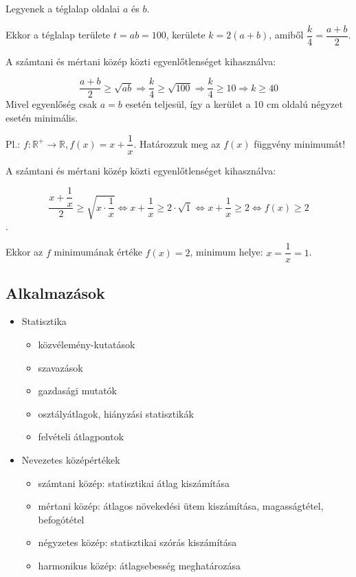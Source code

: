 \documentclass[12pt,a4paper]{article}
\begin{document}
Legyenek a téglalap oldalai $a$ és $b$.

Ekkor a téglalap területe $t = ab = 100$, kerülete $k = 2(a + b)$, amiből $\dfrac{k}{4}=\dfrac{a+b}{2}$.

A számtani és mértani közép közti egyenlőtlenséget kihasználva:

$$\dfrac{a+b}{2}\geq \sqrt{ab}\Rightarrow \dfrac{k}{4}\geq \sqrt{100}\Rightarrow \dfrac{k}{4}\geq 10\Rightarrow k\geq 40$$
Mivel egyenlőség csak $a = b$ esetén teljesül, így a kerület a 10 cm oldalú négyzet esetén minimális.

\vspace{20px}
Pl.: $f: \mathbb{R^+}\rightarrow \mathbb{R}, f(x)=x+\dfrac{1}{x}$. Határozzuk meg az $f(x)$ függvény minimumát!

A számtani és mértani közép közti egyenlőtlenséget kihasználva:

$$\dfrac{x+\dfrac{1}{x}}{2}\geq \sqrt{x\cdot \dfrac{1}{x}}\Leftrightarrow x+\dfrac{1}{x}\geq 2\cdot \sqrt{1}\Leftrightarrow x+\dfrac{1}{x}\geq 2 \Leftrightarrow 	f(x)\geq 2$$.

Ekkor az $f$ minimumának értéke $f(x) = 2$, minimum helye: $x=\dfrac{1}{x}=1$.

\subsection{Alkalmazások}
\begin{itemize}
\item Statisztika
\begin{itemize}
\item közvélemény-kutatások
\item szavazások
\item gazdasági mutatók
\item osztályátlagok, hiányzási statisztikák
\item felvételi átlagpontok
\end{itemize}
\item Nevezetes középértékek
\begin{itemize}
\item számtani közép: statisztikai átlag kiszámítása
\item mértani közép: átlagos növekedési ütem kiszámítása, magasságtétel, befogótétel
\item négyzetes közép: statisztikai szórás kiszámítása
\item harmonikus közép: átlagsebesség meghatározása
\end{itemize}
\end{itemize}
\newpage
\end{document}
